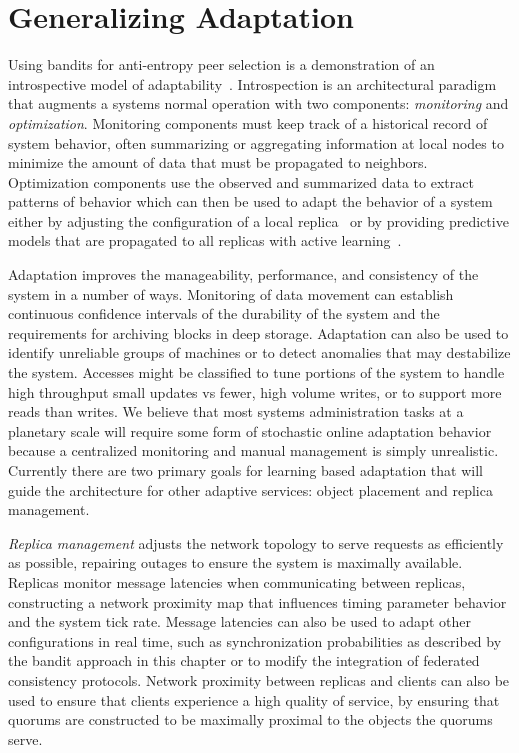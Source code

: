 \section{Generalizing Adaptation}
\label{ch06_generalizing_adaptation}


Using bandits for anti-entropy peer selection is a demonstration of an introspective model of adaptability~\cite{oceanstore}.
Introspection is an architectural paradigm that augments a systems normal operation with two components: \emph{monitoring} and \emph{optimization}.
Monitoring components must keep track of a historical record of system behavior, often summarizing or aggregating information at local nodes to minimize the amount of data that must be propagated to neighbors.
Optimization components use the observed and summarized data to extract patterns of behavior which can then be used to adapt the behavior of a system either by adjusting the configuration of a local replica~\cite{oates_investigating_1998} or by providing predictive models that are propagated to all replicas with active learning~\cite{kalai_efficient_2005,osugi_balancing_2005}.

Adaptation improves the manageability, performance, and consistency of the system in a number of ways.
Monitoring of data movement can establish continuous confidence intervals of the durability of the system and the requirements for archiving blocks in deep storage.
Adaptation can also be used to identify unreliable groups of machines or to detect anomalies that may destabilize the system.
Accesses might be classified to tune portions of the system to handle high throughput small updates vs fewer, high volume writes, or to support more reads than writes.
We believe that most systems administration tasks at a planetary scale will require some form of stochastic online adaptation behavior because a centralized monitoring and manual management is simply unrealistic.
Currently there are two primary goals for learning based adaptation that will guide the architecture for other adaptive services: object placement and replica management.

\emph{Replica management} adjusts the network topology to serve requests as efficiently as possible, repairing outages to ensure the system is maximally available.
Replicas monitor message latencies when communicating between replicas, constructing a network proximity map that influences timing parameter behavior and the system tick rate.
Message latencies can also be used to adapt other configurations in real time, such as synchronization probabilities as described by the bandit approach in this chapter or to modify the integration of federated consistency protocols.
Network proximity between replicas and clients can also be used to ensure that clients experience a high quality of service, by ensuring that quorums are constructed to be maximally proximal to the objects the quorums serve.

